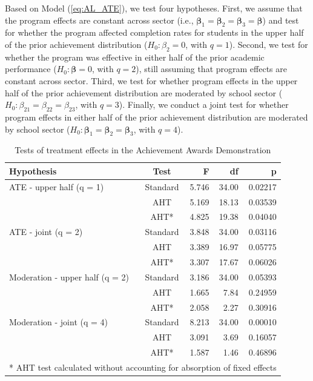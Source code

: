 \documentclass[12pt]{article}\usepackage[]{graphicx}\usepackage[]{color}
\newcommand{\bs}{\boldsymbol}
\begin{document}
Based on Model (\ref{eq:AL_ATE}), we test four hypotheses.
First, we assume that the program effects are constant across sector (i.e., $\bs\beta_1 = \bs\beta_2 = \bs\beta_3 = \bs\beta$) and test for whether the program affected completion rates for students in the upper half of the prior achievement distribution ($H_0: \beta_2 = 0$, with $q = 1$).
Second, we test for whether the program was effective in either half of the prior academic performance ($H_0: \bs\beta = 0$, with $q = 2$), still assuming that program effects are constant across sector. 
Third, we test for whether program effects in the upper half of the prior achievement distribution are moderated by school sector ($H_0: \beta_{21} = \beta_{22} = \beta_{23}$, with $q = 3$). 
Finally, we conduct a joint test for whether program effects in either half of the prior achievement distribution are moderated by school sector ($H_0: \bs\beta_1 = \bs\beta_2 = \bs\beta_3$, with $q = 4$). 

\begin{table}[bth]
\centering
\caption{Tests of treatment effects in the Achievement Awards Demonstration} 
\label{tab:AAD}
\begin{tabular}{lcrrr}
  \toprule
Hypothesis & Test & F & df & p \\ 
  \midrule
ATE - upper half (q = 1) & Standard & 5.746 & 34.00 & 0.02217 \\ 
   & AHT & 5.169 & 18.13 & 0.03539 \\ 
   & AHT* & 4.825 & 19.38 & 0.04040 \\ 
  ATE - joint (q = 2) & Standard & 3.848 & 34.00 & 0.03116 \\ 
   & AHT & 3.389 & 16.97 & 0.05775 \\ 
   & AHT* & 3.307 & 17.67 & 0.06026 \\ 
   \midrule
Moderation - upper half (q = 2) & Standard & 3.186 & 34.00 & 0.05393 \\ 
   & AHT & 1.665 & 7.84 & 0.24959 \\ 
   & AHT* & 2.058 & 2.27 & 0.30916 \\ 
  Moderation - joint (q = 4) & Standard & 8.213 & 34.00 & 0.00010 \\ 
   & AHT & 3.091 & 3.69 & 0.16057 \\ 
   & AHT* & 1.587 & 1.46 & 0.46896 \\ 
   \bottomrule
\multicolumn{5}{l}{\small{* AHT test calculated without accounting for absorption of fixed effects}}
\end{tabular}
\end{table}
\end{document}
